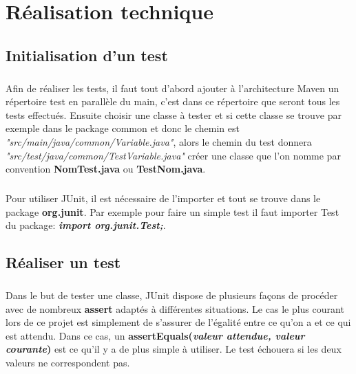 \chapter{Réalisation technique}

\section{Initialisation d'un test}
\paragraph{}
Afin de réaliser les tests, il faut tout d'abord ajouter à l'architecture Maven un répertoire test en parallèle du main, c'est dans ce répertoire que seront tous les tests effectués.
Ensuite choisir une classe à tester et si cette classe se trouve par exemple dans le package common et donc le chemin est \textit{"src/main/java/common/Variable.java"}, alors le chemin du test donnera \textit{"src/test/java/common/TestVariable.java"} créer une classe que l'on nomme par convention \textbf{NomTest.java} ou \textbf{TestNom.java}.

\paragraph{}
Pour utiliser JUnit, il est nécessaire de l'importer et tout se trouve dans le package \textbf{org.junit}. Par exemple pour faire un simple test il faut importer Test du package: \textbf{\textit{import org.junit.Test;}}.

\section{Réaliser un test}
\paragraph{}
Dans le but de tester une classe, JUnit dispose de plusieurs façons de procéder avec de nombreux \textbf{assert} adaptés à différentes situations.
Le cas le plus courant lors de ce projet est simplement de s'assurer de l'égalité entre ce qu'on a et ce qui est attendu. Dans ce cas, un \textbf{assertEquals(\textit{valeur attendue, valeur courante})} est ce qu'il y a de plus simple à utiliser. Le test échouera si les deux valeurs ne correspondent pas.

